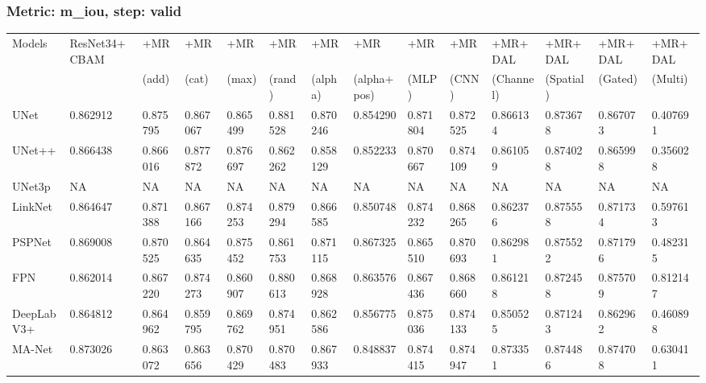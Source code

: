 \documentclass{article}
\begin{document}
\subsubsection{Metric: m\_iou, step: valid}
\begin{tabular}{llllllllllllll}
\toprule
Models & ResNet34+CBAM & +MR  & +MR  & +MR  & +MR  & +MR  & +MR  & +MR  & +MR  & +MR+DAL & +MR+DAL & +MR+DAL & +MR+DAL \\
       &             &  (add) &  (cat) &  (max) &  (rand) &  (alpha) &  (alpha+pos) &  (MLP) &  (CNN) & (Channel) & (Spatial) & (Gated) & (Multi) \\
\midrule
UNet & 0.862912 & 0.875795 & 0.867067 & 0.865499 & 0.881528 & 0.870246 & 0.854290 & 0.871804 & 0.872525 & 0.866134 & 0.873678 & 0.867073 & 0.407691 \\
UNet++ & 0.866438 & 0.866016 & 0.877872 & 0.876697 & 0.862262 & 0.858129 & 0.852233 & 0.870667 & 0.874109 & 0.861059 & 0.874028 & 0.865998 & 0.356028 \\
UNet3p & NA & NA & NA & NA & NA & NA & NA & NA & NA & NA & NA & NA & NA \\
LinkNet & 0.864647 & 0.871388 & 0.867166 & 0.874253 & 0.879294 & 0.866585 & 0.850748 & 0.874232 & 0.868265 & 0.862376 & 0.875558 & 0.871734 & 0.597613 \\
PSPNet & 0.869008 & 0.870525 & 0.864635 & 0.875452 & 0.861753 & 0.871115 & 0.867325 & 0.865510 & 0.870693 & 0.862981 & 0.875522 & 0.871796 & 0.482315 \\
FPN & 0.862014 & 0.867220 & 0.874273 & 0.860907 & 0.880613 & 0.868928 & 0.863576 & 0.867436 & 0.868660 & 0.861218 & 0.872458 & 0.875709 & 0.812147 \\
DeepLabV3+ & 0.864812 & 0.864962 & 0.859795 & 0.869762 & 0.874951 & 0.862586 & 0.856775 & 0.875036 & 0.874133 & 0.850525 & 0.871243 & 0.862962 & 0.460898 \\
MA-Net & 0.873026 & 0.863072 & 0.863656 & 0.870429 & 0.870483 & 0.867933 & 0.848837 & 0.874415 & 0.874947 & 0.873351 & 0.874486 & 0.874708 & 0.630411 \\
\bottomrule
\end{tabular}
\end{document}
